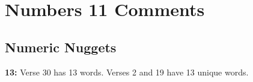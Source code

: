 \section{Numbers 11 Comments}

\subsection{Numeric Nuggets}
\textbf{13: } Verse 30 has 13 words. Verses 2 and 19 have 13 unique words.